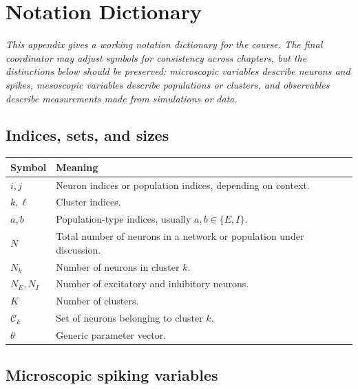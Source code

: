\chapter{Notation Dictionary}
\label{app:notation-dictionary}

\textit{This appendix gives a working notation dictionary for the course. The final coordinator may adjust symbols for consistency across chapters, but the distinctions below should be preserved: microscopic variables describe neurons and spikes, mesoscopic variables describe populations or clusters, and observables describe measurements made from simulations or data.}

\section{Indices, sets, and sizes}
\label{app:notation-indices}

\begin{tabularx}{\textwidth}{@{}p{}X@{}}
\toprule
\textbf{Symbol} & \textbf{Meaning} \\
\midrule
$i,j$ & Neuron indices or population indices, depending on context. \\
$k,\ell$ & Cluster indices. \\
$a,b$ & Population-type indices, usually $a,b\in\{E,I\}$. \\
$N$ & Total number of neurons in a network or population under discussion. \\
$N_k$ & Number of neurons in cluster $k$. \\
$N_E,N_I$ & Number of excitatory and inhibitory neurons. \\
$K$ & Number of clusters. \\
$\mathcal{C}_k$ & Set of neurons belonging to cluster $k$. \\
$\theta$ & Generic parameter vector. \\
\bottomrule
\end{tabularx}

\section{Microscopic spiking variables}
\label{app:notation-microscopic}

